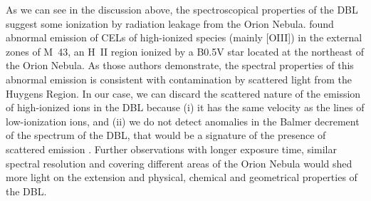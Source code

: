 \documentclass[twocolumn,linenumbers]{aastex63}
\newcommand{\eduardo}[1]{{\color{teal}E: #1}}
\begin{document}
As we can see in the discussion above, the spectroscopical properties of the DBL suggest some ionization by radiation leakage from the Orion Nebula. \citet{simondiaz11} found abnormal emission of CELs of high-ionized species (mainly [O\thinspace III]) in the external zones of M~43, an H~II region ionized by a B0.5V star located at the northeast of the Orion Nebula. As those authors demonstrate, the spectral properties of this abnormal emission is consistent with contamination by scattered light from the Huygens Region. In our case,  we can discard the scattered nature of the emission of high-ionized ions in the DBL because (i) it has the same velocity as the lines of low-ionization ions, and (ii) we do not detect anomalies in the Balmer decrement of the spectrum of the DBL, that would be a signature of the presence of scattered emission \citep[see][]{simondiaz11}. Further observations with longer exposure time, similar spectral resolution and covering different areas of the Orion Nebula would shed more light on the extension and physical, chemical and geometrical properties of the DBL.
\end{document}
